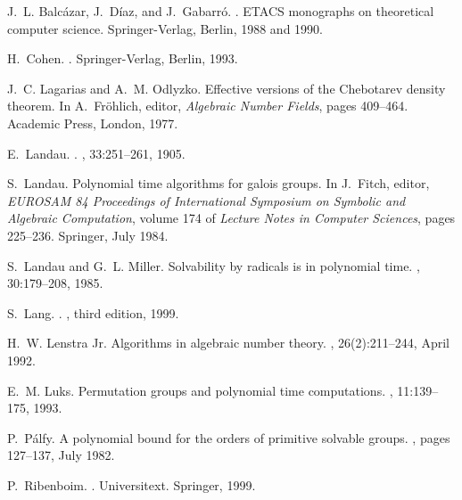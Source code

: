 \documentclass{article}
\begin{document}
\begin{thebibliography}{10}

J.~L. Balc\'azar, J.~D\'iaz, and J.~Gabarr\'o.
.
\newblock ETACS monographs on theoretical computer science. Springer-Verlag,
  Berlin, 1988 and 1990.

H.~Cohen.
.
\newblock Springer-Verlag, Berlin, 1993.

J.~C. Lagarias and A.~M. Odlyzko.
\newblock Effective versions of the {Chebotarev} density theorem.
\newblock In A.~{Fr\"ohlich}, editor, {\em Algebraic {Number Fields}}, pages
  409--464. Academic Press, London, 1977.

E.~Landau.
.
, 33:251--261, 1905.

S.~Landau.
\newblock Polynomial time algorithms for galois groups.
\newblock In J.~Fitch, editor, {\em {EUROSAM 84} Proceedings of International
  Symposium on Symbolic and Algebraic Computation}, volume 174 of {\em Lecture
  Notes in Computer Sciences}, pages 225--236. Springer, July 1984.

S.~Landau and G.~L. Miller.
\newblock Solvability by radicals is in polynomial time.
, 30:179--208, 1985.

S.~Lang.
.
, third edition, 1999.

H.~W. {Lenstra Jr.}
\newblock Algorithms in algebraic number theory.
, 26(2):211--244,
  April 1992.

E.~M. Luks.
\newblock Permutation groups and polynomial time computations.
, 11:139--175, 1993.

P.~{P\'alfy}.
\newblock A polynomial bound for the orders of primitive solvable groups.
, pages 127--137, July 1982.

P.~Ribenboim.
.
\newblock Universitext. Springer, 1999.


\end{thebibliography}
\end{document}
